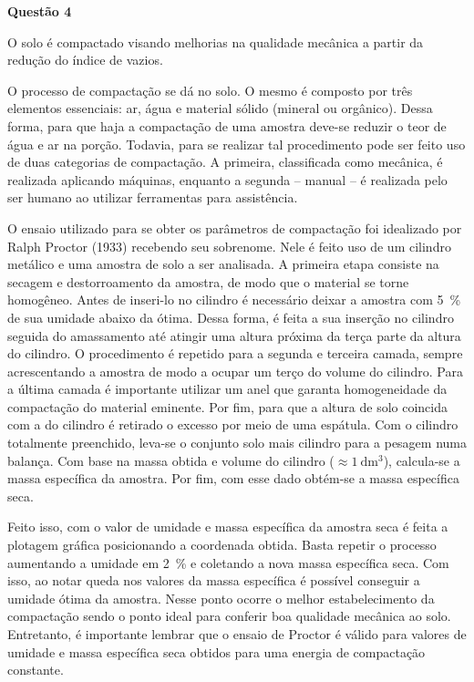 \item[]\textbf{Questão 4}

\hspace{1cm} O solo é compactado visando melhorias na qualidade mecânica a partir da redução do índice de vazios.

\hspace{1cm} O processo de compactação se dá no solo. O mesmo é composto por três elementos essenciais: ar, água e material sólido (mineral ou orgânico). Dessa forma, para que haja a compactação de uma amostra deve-se reduzir o teor de água e ar na porção. Todavia, para se realizar tal procedimento pode ser feito uso de duas categorias de compactação. A primeira, classificada como mecânica, é realizada aplicando máquinas, enquanto a segunda -- manual -- é realizada pelo ser humano ao utilizar ferramentas para assistência. 

\hspace{1cm} O ensaio utilizado para se obter os parâmetros de compactação foi idealizado por Ralph Proctor (1933) recebendo seu sobrenome. Nele é feito uso de um cilindro metálico e uma amostra de solo a ser analisada. A primeira etapa consiste na secagem e destorroamento da amostra, de modo que o material se torne homogêneo. Antes de inseri-lo no cilindro é necessário deixar a amostra com \SI{5}{\%} de sua umidade abaixo da ótima. Dessa forma, é feita a sua inserção no cilindro seguida do amassamento até atingir uma altura próxima da terça parte da altura do cilindro. O procedimento é repetido para a segunda e terceira camada, sempre acrescentando a amostra de modo a ocupar um terço do volume do cilindro. Para a última camada é importante utilizar um anel que garanta homogeneidade da compactação do material eminente. Por fim, para que a altura de solo coincida com a do cilindro é retirado o excesso por meio de uma espátula. Com o cilindro totalmente preenchido, leva-se o conjunto solo mais cilindro para a pesagem numa balança. Com base na massa obtida e volume do cilindro ($\approx\SI{1}{\deci\meter^{3}}$), calcula-se a massa específica da amostra. Por fim, com esse dado obtém-se a massa específica seca. 

\hspace{1cm}Feito isso, com o valor de umidade e massa específica da amostra seca é feita a plotagem gráfica posicionando a coordenada obtida. Basta repetir o processo aumentando a umidade em \SI{2}{\%} e coletando a nova massa específica seca. Com isso, ao notar queda nos valores da massa específica é possível conseguir a umidade ótima da amostra. Nesse ponto ocorre o melhor estabelecimento da compactação sendo o ponto ideal para conferir boa qualidade mecânica ao solo. Entretanto, é importante lembrar que o ensaio de Proctor é válido para valores de umidade e massa específica seca obtidos para uma energia de compactação constante.
